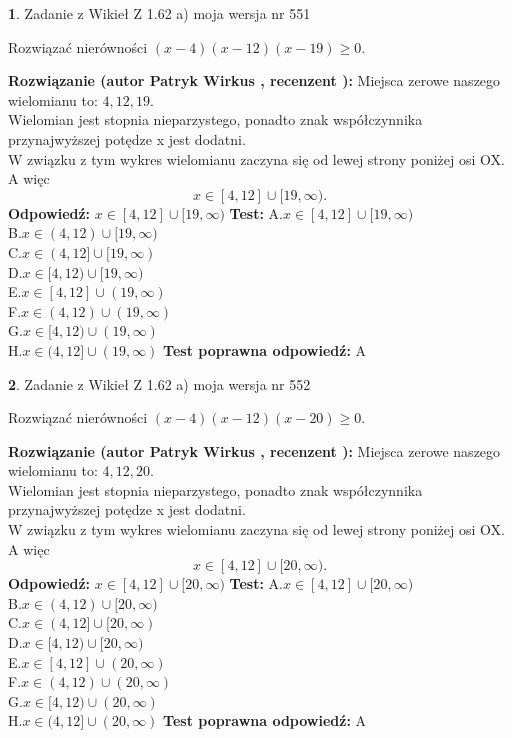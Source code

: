 \documentclass[12pt, a4paper]{article}
\theoremstyle{definition} %
\newtheorem{zad}{}
\newcommand{\zadStart}[1]{\begin{zad}#1\newline}
\newcommand{\zadStop}{\end{zad}}
\newcommand{\rozwStart}[2]{\noindent \textbf{Rozwiązanie (autor #1 , recenzent #2): }\newline}
\newcommand{\rozwStop}{\newline}
\newcommand{\odpStart}{\noindent \textbf{Odpowiedź:}\newline}
\newcommand{\odpStop}{\newline}
\newcommand{\testStart}{\noindent \textbf{Test:}\newline}
\newcommand{\testStop}{\newline}
\newcommand{\kluczStart}{\noindent \textbf{Test poprawna odpowiedź:}\newline}
\newcommand{\kluczStop}{\newline}
\begin{document}
\zadStart{Zadanie z Wikieł Z 1.62 a) moja wersja nr 551}

Rozwiązać nierówności $(x-4)(x-12)(x-19)\ge0$.
\zadStop
\rozwStart{Patryk Wirkus}{}
Miejsca zerowe naszego wielomianu to: $4, 12, 19$.\\
Wielomian jest stopnia nieparzystego, ponadto znak współczynnika przy\linebreak najwyższej potędze x jest dodatni.\\ W związku z tym wykres wielomianu zaczyna się od lewej strony poniżej osi OX. A więc $$x \in [4,12] \cup [19,\infty).$$
\rozwStop
\odpStart
$x \in [4,12] \cup [19,\infty)$
\odpStop
\testStart
A.$x \in [4,12] \cup [19,\infty)$\\
B.$x \in (4,12) \cup [19,\infty)$\\
C.$x \in (4,12] \cup [19,\infty)$\\
D.$x \in [4,12) \cup [19,\infty)$\\
E.$x \in [4,12] \cup (19,\infty)$\\
F.$x \in (4,12) \cup (19,\infty)$\\
G.$x \in [4,12) \cup (19,\infty)$\\
H.$x \in (4,12] \cup (19,\infty)$
\testStop
\kluczStart
A
\kluczStop



\zadStart{Zadanie z Wikieł Z 1.62 a) moja wersja nr 552}

Rozwiązać nierówności $(x-4)(x-12)(x-20)\ge0$.
\zadStop
\rozwStart{Patryk Wirkus}{}
Miejsca zerowe naszego wielomianu to: $4, 12, 20$.\\
Wielomian jest stopnia nieparzystego, ponadto znak współczynnika przy\linebreak najwyższej potędze x jest dodatni.\\ W związku z tym wykres wielomianu zaczyna się od lewej strony poniżej osi OX. A więc $$x \in [4,12] \cup [20,\infty).$$
\rozwStop
\odpStart
$x \in [4,12] \cup [20,\infty)$
\odpStop
\testStart
A.$x \in [4,12] \cup [20,\infty)$\\
B.$x \in (4,12) \cup [20,\infty)$\\
C.$x \in (4,12] \cup [20,\infty)$\\
D.$x \in [4,12) \cup [20,\infty)$\\
E.$x \in [4,12] \cup (20,\infty)$\\
F.$x \in (4,12) \cup (20,\infty)$\\
G.$x \in [4,12) \cup (20,\infty)$\\
H.$x \in (4,12] \cup (20,\infty)$
\testStop
\kluczStart
A
\kluczStop
\end{document}

